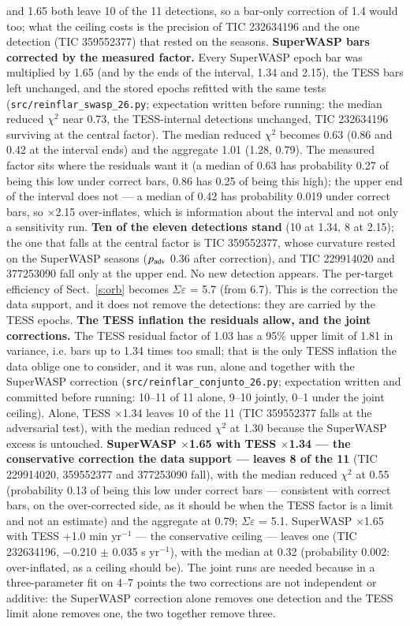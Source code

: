 \documentclass{aa}
\begin{document}
and 1.65 both leave 10 of the 11 detections, so a bar-only correction of 1.4 would too; what the ceiling costs is the precision of TIC 232634196 and the one detection (TIC 359552377) that rested on the seasons.
\textbf{SuperWASP bars corrected by the measured factor.} Every SuperWASP epoch bar was multiplied by 1.65 (and by the ends of the interval, 1.34 and 2.15), the TESS bars left unchanged, and the stored epochs refitted with the same tests (\texttt{src/reinflar\_swasp\_26.py}; expectation written before running: the median reduced $\chi^2$ near 0.73, the TESS-internal detections unchanged, TIC 232634196 surviving at the central factor). The median reduced $\chi^2$ becomes 0.63 (0.86 and 0.42 at the interval ends) and the aggregate 1.01 (1.28, 0.79). The measured factor sits where the residuals want it (a median of 0.63 has probability 0.27 of being this low under correct bars, 0.86 has 0.25 of being this high); the upper end of the interval does not --- a median of 0.42 has probability 0.019 under correct bars, so $\times$2.15 over-inflates, which is information about the interval and not only a sensitivity run. \textbf{Ten of the eleven detections stand} (10 at 1.34, 8 at 2.15); the one that falls at the central factor is TIC 359552377, whose curvature rested on the SuperWASP seasons ($p_{\rm adv}$ 0.36 after correction), and TIC 229914020 and 377253090 fall only at the upper end. No new detection appears. The per-target efficiency of Sect.~\ref{s:orb} becomes $\Sigma\varepsilon$ = 5.7 (from 6.7). This is the correction the data support, and it does not remove the detections: they are carried by the TESS epochs.
\textbf{The TESS inflation the residuals allow, and the joint corrections.} The TESS residual factor of 1.03 has a 95\% upper limit of 1.81 in variance, i.e. bars up to 1.34 times too small; that is the only TESS inflation the data oblige one to consider, and it was run, alone and together with the SuperWASP correction (\texttt{src/reinflar\_conjunto\_26.py}; expectation written and committed before running: 10--11 of 11 alone, 9--10 jointly, 0--1 under the joint ceiling). Alone, TESS $\times$1.34 leaves 10 of the 11 (TIC 359552377 falls at the adversarial test), with the median reduced $\chi^2$ at 1.30 because the SuperWASP excess is untouched. \textbf{SuperWASP $\times$1.65 with TESS $\times$1.34 --- the conservative correction the data support --- leaves 8 of the 11} (TIC 229914020, 359552377 and 377253090 fall), with the median reduced $\chi^2$ at 0.55 (probability 0.13 of being this low under correct bars --- consistent with correct bars, on the over-corrected side, as it should be when the TESS factor is a limit and not an estimate) and the aggregate at 0.79; $\Sigma\varepsilon$ = 5.1. SuperWASP $\times$1.65 with TESS +1.0 min yr$^{-1}$ --- the conservative ceiling --- leaves one (TIC 232634196, $-$0.210 $\pm$ 0.035 s yr$^{-1}$), with the median at 0.32 (probability 0.002: over-inflated, as a ceiling should be). The joint runs are needed because in a three-parameter fit on 4--7 points the two corrections are not independent or additive: the SuperWASP correction alone removes one detection and the TESS limit alone removes one, the two together remove three.
\end{document}
